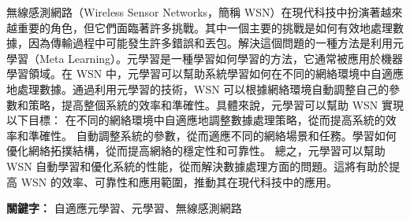 \begin{abstractzh}
無線感測網路（Wireless Sensor Networks，簡稱 WSN）在現代科技中扮演著越來越重要的角色，但它們面臨著許多挑戰。其中一個主要的挑戰是如何有效地處理數據，因為傳輸過程中可能發生許多錯誤和丟包。解決這個問題的一種方法是利用元學習（Meta Learning）。元學習是一種學習如何學習的方法，它通常被應用於機器學習領域。在 WSN 中，元學習可以幫助系統學習如何在不同的網絡環境中自適應地處理數據。通過利用元學習的技術，WSN 可以根據網絡環境自動調整自己的參數和策略，提高整個系統的效率和準確性。具體來說，元學習可以幫助 WSN 實現以下目標：
在不同的網絡環境中自適應地調整數據處理策略，從而提高系統的效率和準確性。
自動調整系統的參數，從而適應不同的網絡場景和任務。學習如何優化網絡拓撲結構，從而提高網絡的穩定性和可靠性。
總之，元學習可以幫助 WSN 自動學習和優化系統的性能，從而解決數據處理方面的問題。這將有助於提高 WSN 的效率、可靠性和應用範圍，推動其在現代科技中的應用。

\providecommand{\keywords}[1]
{
\small  
\textbf{{關鍵字：}} #1
}
\keywords{自適應元學習、元學習、無線感測網路}
\end{abstractzh}